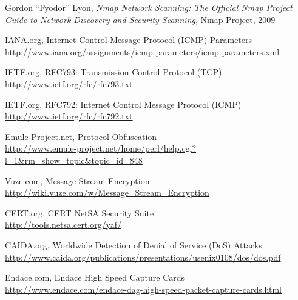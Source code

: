 \documentclass[a4paper]{scrartcl}
\begin{document}
\newpage
\begin{thebibliography}{9}

	 Gordon ``Fyodor'' Lyon, \emph{Nmap Network Scanning: The Official Nmap Project Guide to Network Discovery and Security Scanning},
	Nmap Project,
	2009
	
	 IANA.org, Internet Control Message Protocol (ICMP) Parameters \\
	\url{http://www.iana.org/assignments/icmp-parameters/icmp-parameters.xml}
	
	 IETF.org, RFC793: Transmission Control Protocol (TCP) \\
	\url{http://www.ietf.org/rfc/rfc793.txt}
	
	 IETF.org, RFC792: Internet Control Message Protocol (ICMP) \\
	\url{http://www.ietf.org/rfc/rfc792.txt}
	
	 Emule-Project.net, Protocol Obfuscation \\
	\url{http://www.emule-project.net/home/perl/help.cgi?l=1&rm=show_topic&topic_id=848}
	
	 Vuze.com, Message Stream Encryption \\
	\url{http://wiki.vuze.com/w/Message_Stream_Encryption}
	
	 CERT.org, CERT NetSA Security Suite \\
	\url{http://tools.netsa.cert.org/yaf/}
	
	 CAIDA.org, Worldwide Detection of Denial of Service (DoS) Attacks \\
	\url{http://www.caida.org/publications/presentations/usenix0108/dos/dos.pdf}
	
	 Endace.com, Endace High Speed Capture Cards \\
	\url{http://www.endace.com/endace-dag-high-speed-packet-capture-cards.html}
	
\end{thebibliography}
\end{document}
